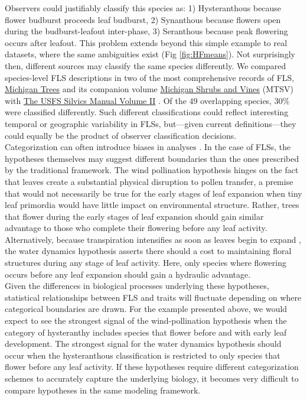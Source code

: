 \documentclass[12pt]{article}
\begin{document}
\noindent Observers could justifiably classify this species as: 1) Hysteranthous because flower budburst proceeds leaf budburst, 2) Synanthous because flowers open during the budburst-leafout inter-phase, 3) Seranthous because peak flowering occurs after leafout. This problem extends beyond this simple example to real datasets, \citep[e.g.][]{OKeefe2015} where the same ambiguities exist (Fig \ref{fig:HFmeans}). Not surprisingly then, different sources may classify the same species differently. We compared species-level FLS descriptions in two of the most comprehensive records of FLS, \underline{Michigan Trees} and its companion volume \underline{Michigan Shrubs and Vines} (MTSV) \citep{Barnes2004,Barnes2016} with \underline{The USFS Silvics Manual Volume II} \citep{Burns1990}. Of the 49 overlapping species, 30\% were classified differently. Such different classifications could reflect interesting temporal or geographic variability in FLSs, but---given current definitions---they could equally be the product of observer classification decisions.\\

\noindent Categorization can often introduce biases in analyses \citep{Royston2006}. In the case of FLSs, the hypotheses themselves may suggest different boundaries than the ones prescribed by the traditional framework. The wind pollination hypothesis hinges on the fact that leaves create a substantial physical disruption to pollen transfer, a premise that would not necessarily be true for the early stages of leaf expansion when tiny leaf primordia would have little impact on environmental structure. Rather, trees that flower during the early stages of leaf expansion should gain similar advantage to those who complete their flowering before any leaf activity. Alternatively, because transpiration intensifies as soon as leaves begin to expand \citep{%
Wang2018}, the water dynamics hypothesis asserts there should a cost to maintaining floral structures during any stage of leaf activity. Here, only species where flowering occurs before any leaf expansion should gain a hydraulic advantage.\\ 

\noindent Given the differences in biological processes underlying these hypotheses, statistical relationships between FLS and traits will fluctuate depending on where categorical boundaries are drawn. For the example presented above, we would expect to see the strongest signal of the wind-pollination hypothesis when the category of hysteranthy includes species that flower before and with early leaf development. The strongest signal for the water dynamics hypothesis should occur when the hysteranthous classification is restricted to only species that flower before any leaf activity. If these hypotheses require different categorization schemes to accurately capture the underlying biology, it becomes very difficult to compare hypotheses in the same modeling framework.\\
\end{document}
